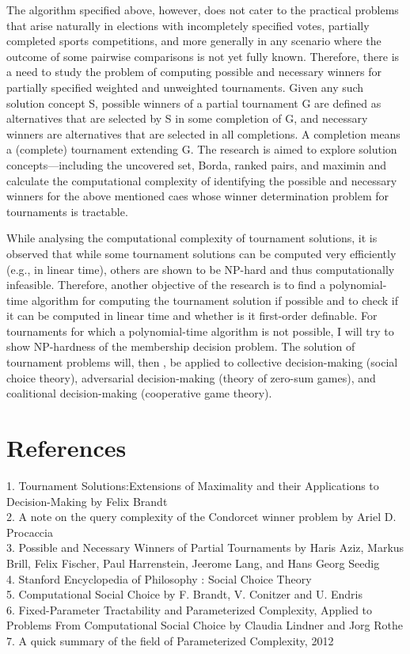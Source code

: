 \documentclass{article}
\begin{document}
The algorithm specified above, however, does not cater to the practical problems that arise naturally in elections with incompletely specified votes, partially completed sports competitions, and more generally in any scenario where the outcome of some pairwise comparisons is not yet fully known. Therefore, there is a need to study the problem of computing possible and necessary winners for partially specified weighted and unweighted tournaments. Given any such solution concept S, possible winners of a partial tournament G are defined as alternatives that are selected by S in some completion of G, and necessary winners are alternatives that are selected in all completions. A completion means a (complete) tournament extending G. The research is aimed to explore solution concepts—including the uncovered set, Borda, ranked pairs, and maximin and calculate the computational complexity of identifying the possible and necessary winners for the above mentioned caes whose winner determination problem for tournaments is tractable.\par
While analysing the computational complexity of tournament solutions, it is observed that while some tournament solutions can be computed very efficiently (e.g., in linear time), others are shown to be NP-hard and thus computationally infeasible. Therefore, another objective of the research is to find a polynomial-time algorithm for computing the tournament solution if possible and to check if it can be computed in linear time and whether is it first-order definable. For tournaments for which a polynomial-time algorithm is not possible, I will try to show NP-hardness of the membership decision problem. The solution of tournament problems will, then , be applied to collective decision-making (social choice theory), adversarial decision-making (theory of zero-sum games), and coalitional decision-making (cooperative game theory).

\section{References}

1. Tournament Solutions:Extensions of Maximality and their Applications to Decision-Making by Felix Brandt\\
2. A note on the query complexity of the Condorcet winner problem by Ariel D. Procaccia\\
3. Possible and Necessary Winners of Partial Tournaments by Haris Aziz, Markus Brill, Felix Fischer, Paul Harrenstein, Jeerome Lang, and Hans     Georg Seedig\\
4. Stanford Encyclopedia of Philosophy : Social Choice Theory\\
5. Computational Social Choice by F. Brandt, V. Conitzer and U. Endris\\
6. Fixed-Parameter Tractability and Parameterized Complexity, Applied to Problems From Computational Social Choice by Claudia Lindner and Jorg    Rothe\\
7. A quick summary of the field of Parameterized Complexity, 2012\\

  
\end{document}
